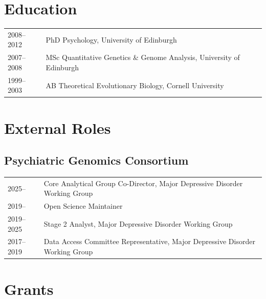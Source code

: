\documentclass[11pt]{article}
\begin{document}
\section*{Education}

\begin{tabular}{p{3cm}p{12cm}}

2008--2012 & PhD Psychology, University of Edinburgh \\

2007--2008 & MSc Quantitative Genetics \& Genome Analysis, University of Edinburgh \\ 

1999–2003 & AB Theoretical Evolutionary Biology, Cornell University

\end{tabular}

\section*{External Roles}

\subsection*{Psychiatric Genomics Consortium}

\begin{tabular}{p{3cm}p{12cm}}
2025-- & Core Analytical Group Co-Director, Major Depressive Disorder Working Group \\ 
  
2019-- & Open Science Maintainer \\ 

2019--2025 & Stage 2 Analyst, Major Depressive Disorder Working Group \\ 

2017--2019 & Data Access Committee Representative, Major Depressive Disorder Working Group 

\end{tabular}

\section*{Grants}
\end{document}
